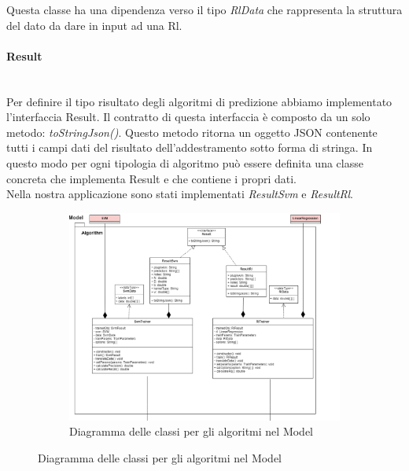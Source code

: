 		Questa classe ha una dipendenza verso il tipo \textit{RlData} che rappresenta la struttura del dato da dare in input ad una Rl\glo.
		\paragraph*{Result} \mbox{} \\[1mm]
		Per definire il tipo risultato degli algoritmi di predizione abbiamo implementato l'interfaccia Result. Il contratto di questa interfaccia è composto da un solo metodo: \textit{toStringJson()}. Questo metodo ritorna un oggetto JSON contenente tutti i campi dati del risultato dell'addestramento sotto forma di stringa. In questo modo per ogni tipologia di algoritmo può essere definita una classe concreta che implementa Result e che contiene i propri dati. \\
		Nella nostra applicazione sono stati implementati \textit{ResultSvm} e \textit{ResultRl}.
		\mbox{}
		\begin{landscape}
			\begin{figure}
				\begin{figure} [H]
					\includegraphics[width=\linewidth]{img/Diagrammi/algorithm-app.png}
					\caption{Diagramma delle classi per gli algoritmi nel Model}
				\end{figure}
			\end{figure}
		\end{landscape}
